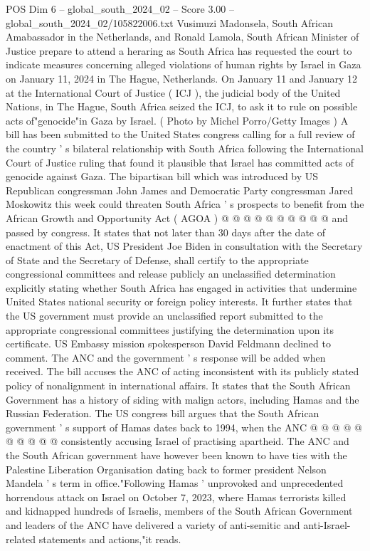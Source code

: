 \begin{textsample}{POS Dim 6 – global\_south\_2024\_02 – Score 3.00 – global\_south\_2024\_02/105822006.txt}  \label{ex:f6_pos_190}
Vusimuzi Madonsela, South African Amabassador in the Netherlands, and Ronald Lamola, South African Minister of Justice prepare to attend a heraring as South Africa has requested the court to indicate measures concerning alleged violations of human rights by Israel in Gaza on January 11, 2024 in The Hague, Netherlands.
On January 11 and January 12 at the International Court of Justice ( ICJ ), the judicial body of the United Nations, in The Hague, South Africa seized the ICJ, to ask it to rule on possible acts of"genocide"in Gaza by Israel. ( Photo by Michel Porro/Getty Images ) A bill has been submitted to the United States congress calling for a full review of the country ' s bilateral relationship with South Africa following the International Court of Justice ruling that found it plausible that Israel has committed acts of genocide against Gaza.
The bipartisan bill which was introduced by US Republican congressman John James and Democratic Party congressman Jared Moskowitz this week could threaten South Africa ' s prospects to benefit from the African Growth and Opportunity Act ( AGOA ) @ @ @ @ @ @ @ @ @ @ and passed by congress.
It states that not later than 30 days after the date of enactment of this Act, US President Joe Biden in consultation with the Secretary of State and the Secretary of Defense, shall certify to the appropriate congressional committees and release publicly an unclassified determination explicitly stating whether South Africa has engaged in activities that undermine United States national security or foreign policy interests.
It further states that the US government must provide an unclassified report submitted to the appropriate congressional committees justifying the determination upon its certificate.
US Embassy mission spokesperson David Feldmann declined to comment.
The ANC and the government ' s response will be added when received.
The bill accuses the ANC of acting inconsistent with its publicly stated policy of nonalignment in international affairs.
It states that the South African Government has a history of siding with malign actors, including Hamas and the Russian Federation.
The US congress bill argues that the South African government ' s support of Hamas dates back to 1994, when the ANC @ @ @ @ @ @ @ @ @ @ consistently accusing Israel of practising apartheid.
The ANC and the South African government have however been known to have ties with the Palestine Liberation Organisation dating back to former president Nelson Mandela ' s term in office."Following Hamas ' unprovoked and unprecedented horrendous attack on Israel on October 7, 2023, where Hamas terrorists killed and kidnapped hundreds of Israelis, members of the South African Government and leaders of the ANC have delivered a variety of anti-semitic and anti-Israel-related statements and actions,"it reads.

\end{textsample}

